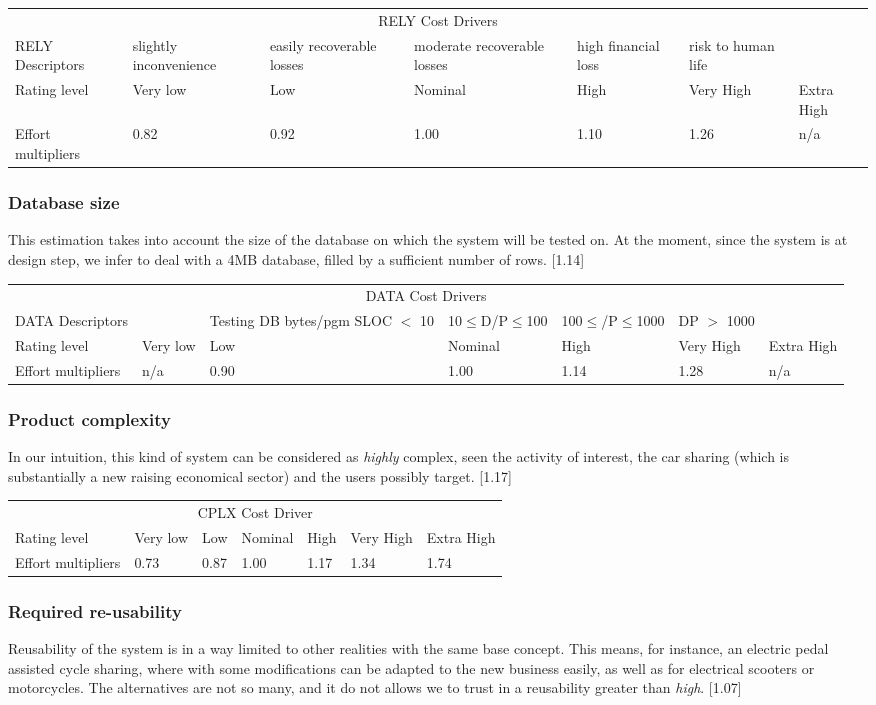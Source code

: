 \documentclass{scrreprt}
\newcommand{\costdescriptors}[7]{
	#1 & #2 & #3 & #4 & #5 & #6 & #7\\
}
\newcommand{\ratinglevel}[6]{
	Rating level & #1 & #2 & #3 & #4 & #5 & #6 \\\hline
}
\newcommand{\effortmultipliers}[6]{
	Effort multipliers & #1 & #2 & #3 & #4 & #5 & #6 \\\hline
}
\newenvironment{costdriverstable}[1]{
	\setlength{\LTleft}{-40pt}
	\begin{longtable}{|p{\dimexpr.16\textwidth}|p{\dimexpr.14\textwidth}|p{\dimexpr.14\textwidth}|p{\dimexpr.14\textwidth}|p{\dimexpr.14\textwidth}|p{\dimexpr.14\textwidth}|p{\dimexpr.14\textwidth}|}
	\hline
	\multicolumn{7}{|c|}{{#1}}\\\hhline{|=======|}
}{
	\hline\end{longtable}
}
\begin{document}
\begin{costdriverstable}{RELY Cost Drivers}
	\costdescriptors{RELY Descriptors}{slightly inconvenience}{easily recoverable losses}{moderate recoverable losses}{high financial loss}{risk to human life}{}\hline
	\ratinglevel{Very low}{Low}{Nominal}{High}{Very High}{Extra High}
	\effortmultipliers{0.82}{0.92}{\cellcolor[gray]{0.75}1.00}{1.10}{1.26}{n/a}
\end{costdriverstable}

\subsubsection{Database size}
This estimation takes into account the size of the database on which the system will be tested on. At the moment, since the system is at design step, we infer to deal with a 4MB database, filled by a sufficient number of rows. [1.14]

\begin{costdriverstable}{DATA Cost Drivers}
	\costdescriptors{DATA Descriptors}{}{Testing DB bytes/pgm SLOC $<$ 10}{10$\le$D/P$\le$100}{100$\le$/P$\le$1000}{DP $>$ 1000}{}\hline
	\ratinglevel{Very low}{Low}{Nominal}{High}{Very High}{Extra High}
	\effortmultipliers{n/a}{0.90}{1.00}{\cellcolor[gray]{0.75}1.14}{1.28}{n/a}
\end{costdriverstable}

\subsubsection{Product complexity}
In our intuition, this kind of system can be considered as \emph{highly} complex, seen the activity of interest, the car sharing (which is substantially a new raising economical sector) and the users possibly target. [1.17]


\begin{costdriverstable}{CPLX Cost Driver}
	\ratinglevel{Very low}{Low}{Nominal}{High}{Very High}{Extra High}
	\effortmultipliers{0.73}{0.87}{1.00}{\cellcolor[gray]{0.75}1.17}{1.34}{1.74}	
\end{costdriverstable}

\subsubsection{Required re-usability}

Reusability of the system is in a way limited to other realities with the same base concept. This means, for instance, an electric pedal assisted cycle sharing, where with some modifications can be adapted to the new business easily, as well as for electrical scooters or motorcycles. The alternatives are not so many, and it do not allows we to trust in a reusability greater than \emph{high}. [1.07]
\end{document}
